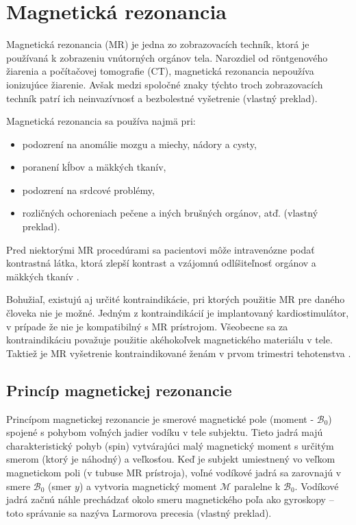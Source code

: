 \chapter {Magnetická rezonancia}

Magnetická rezonancia (MR) je jedna zo zobrazovacích techník, ktorá je používaná k zobrazeniu vnútorných orgánov tela.
Narozdiel od röntgenového žiarenia a počítačovej tomografie (CT), magnetická rezonancia nepoužíva ionizujúce žiarenie. Avšak medzi spoločné znaky týchto troch zobrazovacích techník patrí ich neinvazívnosť a bezbolestné vyšetrenie \cite{basic_principles_of_mri} (vlastný preklad). \newline

Magnetická rezonancia sa používa najmä pri:
\begin {itemize}
\item {podozrení na anomálie mozgu a miechy, nádory a cysty,}
\item {poranení kĺbov a mäkkých tkanív,}
\item {podozrení na srdcové problémy,}
\item {rozličných ochoreniach pečene a iných brušných orgánov, atď. \cite{mr_usage} (vlastný preklad).}
\end {itemize}

Pred niektorými MR procedúrami sa pacientovi môže intravenózne podať kontrastná látka, ktorá zlepší kontrast a vzájomnú odlíšiteľnosť orgánov a mäkkých tkanív \cite{contrast_agents}.

Bohužiaľ, existujú aj určité kontraindikácie, pri ktorých použitie MR pre daného človeka nie je možné.
Jedným z kontraindikácií je implantovaný kardiostimulátor, v prípade že nie je kompatibilný s MR prístrojom. Všeobecne sa za kontraindikáciu považuje použitie akéhokoľvek magnetického materiálu v tele. Taktiež je MR vyšetrenie kontraindikované ženám v prvom trimestri tehotenstva \cite{mr_contraindications}.

\section {Princíp magnetickej rezonancie}

Princípom magnetickej rezonancie je smerové magnetické pole (moment - $\mathcal{B}_{0}$) spojené s pohybom voľných jadier vodíku v tele subjektu. Tieto jadrá majú charakteristický pohyb (spin) vytvárajúci malý magnetický moment s určitým smerom (ktorý je náhodný) a veľkosťou. Keď je subjekt umiestnený vo veľkom magnetickom poli (v tubuse MR prístroja), voľné vodíkové jadrá sa zarovnajú v smere $\mathcal{B}_{0}$ (smer $y$) a vytvoria magnetický moment $\mathcal{M}$ paralelne k $\mathcal{B}_{0}$. Vodíkové jadrá začnú náhle prechádzať okolo smeru magnetického poľa ako gyroskopy -- toto správanie sa nazýva Larmorova precesia \cite{basic_principles_of_mri} (vlastný preklad).

